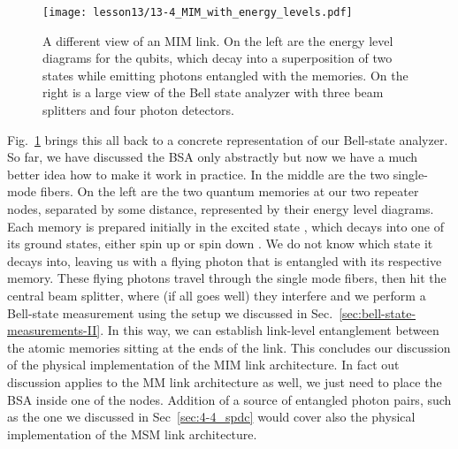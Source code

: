 \begin{figure}[t]
    \centering
    \texttt{[image: lesson13/13-4\_MIM\_with\_energy\_levels.pdf]}
    \caption[Physical implementation of the MIM link.]{A different view of an MIM link. On the left are the energy level diagrams for the qubits, which decay into a superposition of two states while emitting photons entangled with the memories. On the right is a large view of the Bell state analyzer with three beam splitters and four photon detectors.}
    \label{fig:13-MIM-energy}
\end{figure}

Fig.~\ref{fig:13-MIM-energy} brings this all back to a concrete representation of our Bell-state analyzer.
So far, we have discussed the BSA only abstractly but now we have a much better idea how to make it work in practice.
In the middle are the two single-mode fibers.
On the left are the two quantum memories at our two repeater nodes, separated by some distance, represented by their energy level diagrams.
Each memory is prepared initially in the excited state , which decays into one of its ground states, either spin up \ket{\uparrow} or spin down \ket{\downarrow}.
We do not know which state it decays into, leaving us with a flying photon that is entangled with its respective memory.
These flying photons travel through the single mode fibers, then hit the central beam splitter, where (if all goes well) they interfere and we perform a Bell-state measurement using the setup we discussed in Sec.~\ref{sec:bell-state-measurements-II}.
In this way, we can establish link-level entanglement between the atomic memories sitting at the ends of the link.
This concludes our discussion of the physical implementation of the MIM link architecture.
In fact out discussion applies to the MM link architecture as well, we just need to place the BSA inside one of the nodes.
Addition of a source of entangled photon pairs, such as the one we discussed in Sec~\ref{sec:4-4_spdc} would cover also the physical implementation of the MSM link architecture.






